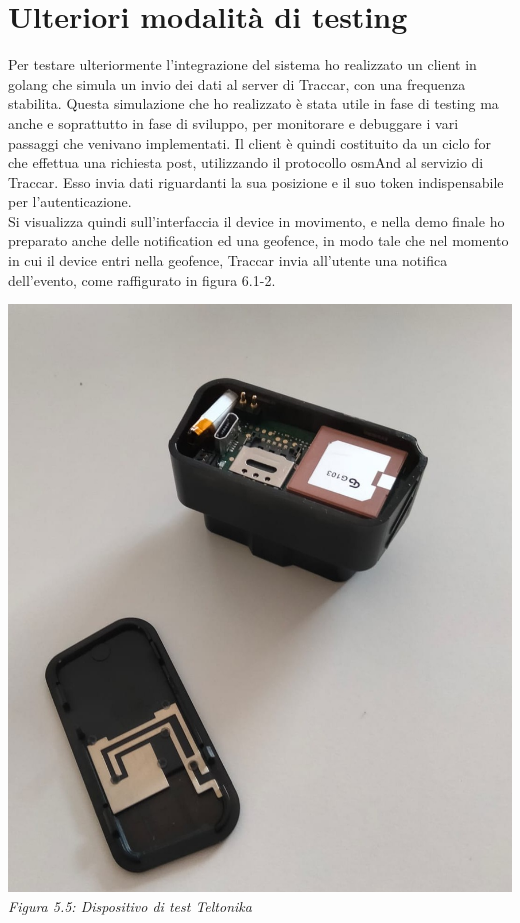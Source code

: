 \documentclass[a4paper,titlepage,12pt]{report}
\begin{document}
{\section{
Ulteriori modalità di testing}
Per testare ulteriormente l'integrazione del sistema ho realizzato un client in golang che simula un invio dei dati al server di Traccar, con una frequenza stabilita. Questa simulazione che ho realizzato è stata utile in fase di testing ma anche e soprattutto in fase di sviluppo, per monitorare e debuggare i vari passaggi che venivano implementati. Il client è quindi costituito da un ciclo for che effettua una richiesta post, utilizzando il protocollo osmAnd al servizio di Traccar. Esso invia dati riguardanti la sua posizione e il suo token indispensabile per l'autenticazione.\\
Si visualizza quindi sull'interfaccia il device in movimento, e nella demo finale ho preparato anche delle notification ed una geofence, in modo tale che nel momento in cui il device entri nella geofence, Traccar invia all'utente una notifica dell'evento, come raffigurato in figura 6.1-2.\\
\begin{center}
\includegraphics[scale=0.2]{images/teltotest.jpeg}\\ 
\textit{Figura 5.5: Dispositivo di test Teltonika}
\end{center}

}
\end{document}
